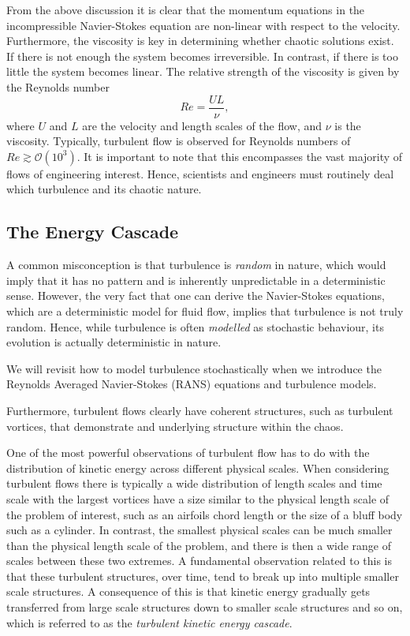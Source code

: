 From the above discussion it is clear that the momentum equations in the incompressible Navier-Stokes equation are non-linear with respect to the velocity. Furthermore, the viscosity is key in determining whether chaotic solutions exist. If there is not enough the system becomes irreversible. In contrast, if there is too little the system becomes linear. The relative strength of the viscosity is given by the Reynolds number
\begin{equation}
	Re = \frac{UL}{\nu},
\end{equation}
where $U$ and $L$ are the velocity and length scales of the flow, and $\nu$ is the viscosity. Typically, turbulent flow is observed for Reynolds numbers of $Re \gtrsim \mathcal{O}(10^3)$. It is important to note that this encompasses the vast majority of flows of engineering interest. Hence, scientists and engineers must routinely deal which turbulence and its chaotic nature.

\subsection{The Energy Cascade}
A common misconception is that turbulence is {\it random} in nature, which would imply that it has no pattern and is inherently unpredictable in a deterministic sense. However, the very fact that one can derive the Navier-Stokes equations, which are a deterministic model for fluid flow, implies that turbulence is not truly random. Hence, while turbulence is often {\it modelled} as stochastic behaviour, its evolution is actually deterministic in nature.
\begin{remark}
We will revisit how to model turbulence stochastically when we introduce the Reynolds Averaged Navier-Stokes (RANS) equations and turbulence models.
\end{remark}
Furthermore, turbulent flows clearly have coherent structures, such as turbulent vortices, that demonstrate and underlying structure within the chaos.

One of the most powerful observations of turbulent flow has to do with the distribution of kinetic energy across different physical scales. When considering turbulent flows there is typically a wide distribution of length scales and time scale with the largest vortices have a size similar to the physical length scale of the problem of interest, such as an airfoils chord length or the size of a bluff body such as a cylinder. In contrast, the smallest physical scales can be much smaller than the physical length scale of the problem, and there is then a wide range of scales between these two extremes. A fundamental observation related to this is that these turbulent structures, over time, tend to break up into multiple smaller scale structures. A consequence of this is that kinetic energy gradually gets transferred from large scale structures down to smaller scale structures and so on, which is referred to as the {\it turbulent kinetic energy cascade}.

